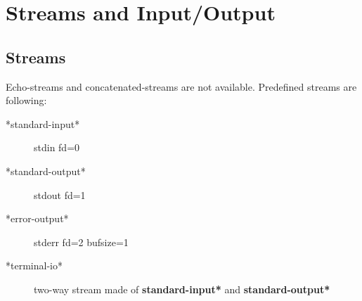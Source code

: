 \section{Streams and Input/Output}

\subsection{Streams}

Echo-streams and concatenated-streams are not available.
Predefined streams are following:

\begin{description}
\item[*standard-input*] stdin fd=0
\item[*standard-output*] stdout fd=1 
\item[*error-output*] stderr fd=2 bufsize=1
\item[*terminal-io*] two-way stream made of 
{\bf *standard-input*} and {\bf *standard-output*}
\end{description}

